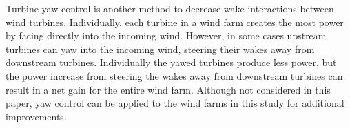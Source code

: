 Turbine yaw control is another method to decrease wake interactions between wind turbines. Individually, each turbine in a wind farm creates the most power by facing directly into the incoming wind. However, in some cases upstream turbines can yaw into the incoming wind, steering their wakes away from downstream turbines\cite{jimenez2010application,fleming2016detailed}. Individually the yawed turbines produce less power, but the power increase from steering the wakes away from downstream turbines can result in a net gain for the entire wind farm\cite{gebraad2017maximization}. Although not considered in this paper, yaw control can be applied to the wind farms in this study for additional improvements.


